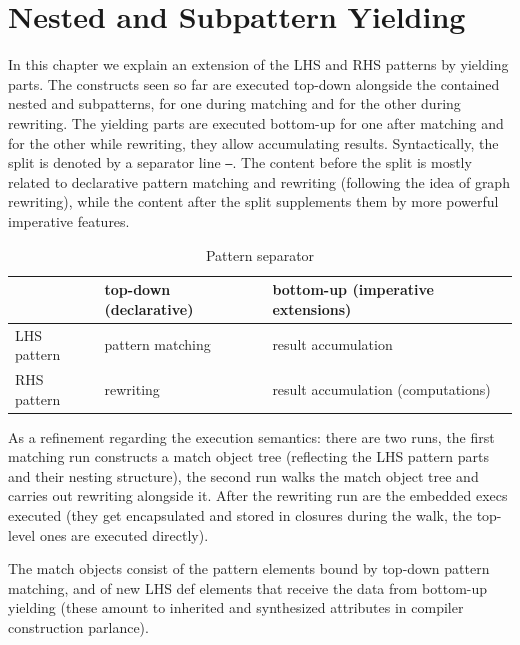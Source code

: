 \chapter{Nested and Subpattern Yielding}%
\label{cha:yielding}

In this chapter we explain an extension of the LHS and RHS patterns by yielding parts.
The constructs seen so far are executed top-down alongside the contained nested and subpatterns, for one during matching and for the other during rewriting.
The yielding parts are executed bottom-up for one after matching and for the other while rewriting, they allow accumulating results.
Syntactically, the split is denoted by a separator line \texttt{---}.
The content before the split is mostly related to declarative pattern matching and rewriting (following the idea of graph rewriting), while the content after the split supplements them by more powerful imperative features.

\begin{table}[htbp]
  \centering
  \begin{tabularx}{\linewidth}{|l|X|X|} 
		\hline
     & top-down (declarative) & bottom-up (imperative extensions) \\
		\hline
    LHS pattern & pattern matching & result accumulation \\
		\hline
    RHS pattern & rewriting & result accumulation (computations) \\
		\hline
  \end{tabularx}
  \caption{Pattern separator}
  \label{patternsepar}
\end{table}

As a refinement regarding the execution semantics:
there are two runs, the first matching run constructs a match object tree (reflecting the LHS pattern parts and their nesting structure),
the second run walks the match object tree and carries out rewriting alongside it.
After the rewriting run are the embedded execs executed (they get encapsulated and stored in closures during the walk, the top-level ones are executed directly).

The match objects consist of the pattern elements bound by top-down pattern matching,
and of new LHS def elements that receive the data from bottom-up yielding
(these amount to inherited and synthesized attributes in compiler construction parlance).

